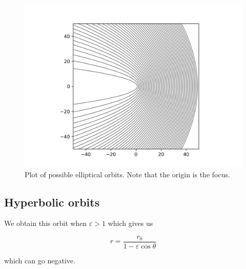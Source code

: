 \begin{frame}{\subsecname}
\begin{figure}
    \centering
    \includegraphics[height = 0.8\textheight]{assets/parabola.png}
    \caption{Plot of possible elliptical orbits. Note that the origin is the focus.}
    \label{fig:my_label}
\end{figure}
\end{frame}

\subsection{Hyperbolic orbits}
\begin{frame}{\subsecname}

We obtain this orbit when \(\varepsilon > 1\) which gives us

\begin{equation}
    r = \frac{r_0}{1- \varepsilon \cos \theta}
\end{equation}

which can go negative.

\end{frame}

